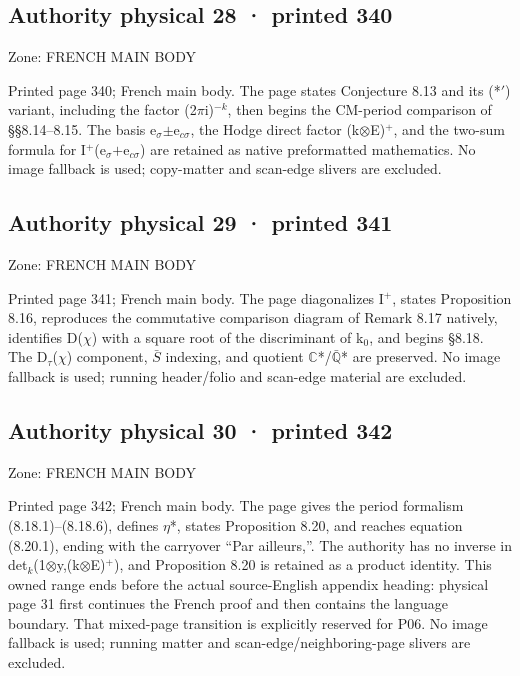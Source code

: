 \documentclass[10pt,twoside]{article}
\begin{document}
\subsection*{Authority physical 28 · printed 340}
\noindent\textsf{Zone: FRENCH MAIN BODY}\par
Printed page 340; French main body. The page states Conjecture 8.13 and its (*\ensuremath{′}) variant, including the factor (2\ensuremath{π}i)\ensuremath{^{-k}}, then begins the CM-period comparison of \S{}\S{}8.14–8.15. The basis e\ensuremath{_{σ}}\ensuremath{±}e\ensuremath{_{cσ}}, the Hodge direct factor (k\ensuremath{⊗}E)\ensuremath{^{+}}, and the two-sum formula for I\ensuremath{^{+}}(e\ensuremath{_{σ}}\ensuremath{+}e\ensuremath{_{cσ}}) are retained as native preformatted mathematics. No image fallback is used; copy-matter and scan-edge slivers are excluded.\par
\subsection*{Authority physical 29 · printed 341}
\noindent\textsf{Zone: FRENCH MAIN BODY}\par
Printed page 341; French main body. The page diagonalizes I\ensuremath{^{+}}, states Proposition 8.16, reproduces the commutative comparison diagram of Remark 8.17 natively, identifies D(\ensuremath{χ}) with a square root of the discriminant of k\ensuremath{_{0}}, and begins \S{}8.18. The D\ensuremath{_{τ}}(\ensuremath{χ}) component, \ensuremath{\bar{S}} indexing, and quotient \ensuremath{ℂ}*/\ensuremath{\bar{ℚ}}* are preserved. No image fallback is used; running header/folio and scan-edge material are excluded.\par
\subsection*{Authority physical 30 · printed 342}
\noindent\textsf{Zone: FRENCH MAIN BODY}\par
Printed page 342; French main body. The page gives the period formalism (8.18.1)–(8.18.6), defines \ensuremath{η}*, states Proposition 8.20, and reaches equation (8.20.1), ending with the carryover “Par ailleurs,”. The authority has no inverse in det\ensuremath{_{k}}(1\ensuremath{⊗}y,(k\ensuremath{⊗}E)\ensuremath{^{+}}), and Proposition 8.20 is retained as a product identity. This owned range ends before the actual source-English appendix heading: physical page 31 first continues the French proof and then contains the language boundary. That mixed-page transition is explicitly reserved for P06. No image fallback is used; running matter and scan-edge/neighboring-page slivers are excluded.\par
\end{document}
